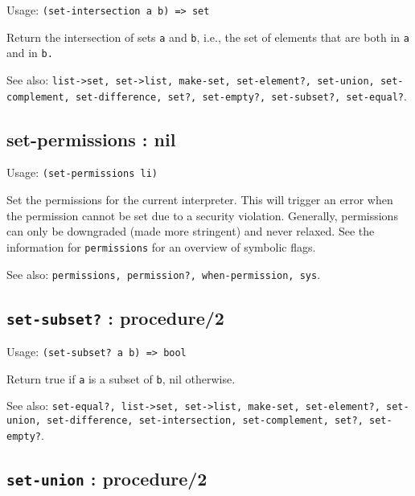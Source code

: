 \documentclass[
]{article}
\newcommand{\passthrough}[1]{#1}
\begin{document}
Usage: \passthrough{\lstinline!(set-intersection a b) => set!}

Return the intersection of sets \passthrough{\lstinline!a!} and
\passthrough{\lstinline!b!}, i.e., the set of elements that are both in
\passthrough{\lstinline!a!} and in \passthrough{\lstinline!b.!}

See also:
\passthrough{\lstinline!list->set, set->list, make-set, set-element?, set-union, set-complement, set-difference, set?, set-empty?, set-subset?, set-equal?!}.

\hypertarget{set-permissions-nil-1}{%
\subsection{set-permissions : nil}\label{set-permissions-nil-1}}

Usage: \passthrough{\lstinline!(set-permissions li)!}

Set the permissions for the current interpreter. This will trigger an
error when the permission cannot be set due to a security violation.
Generally, permissions can only be downgraded (made more stringent) and
never relaxed. See the information for
\passthrough{\lstinline!permissions!} for an overview of symbolic flags.

See also:
\passthrough{\lstinline!permissions, permission?, when-permission, sys!}.

\hypertarget{set-subset-procedure2-1}{%
\subsection{\texorpdfstring{\texttt{set-subset?} :
procedure/2}{set-subset? : procedure/2}}\label{set-subset-procedure2-1}}

Usage: \passthrough{\lstinline!(set-subset? a b) => bool!}

Return true if \passthrough{\lstinline!a!} is a subset of
\passthrough{\lstinline!b!}, nil otherwise.

See also:
\passthrough{\lstinline!set-equal?, list->set, set->list, make-set, set-element?, set-union, set-difference, set-intersection, set-complement, set?, set-empty?!}.

\hypertarget{set-union-procedure2-1}{%
\subsection{\texorpdfstring{\texttt{set-union} :
procedure/2}{set-union : procedure/2}}\label{set-union-procedure2-1}}
\end{document}
